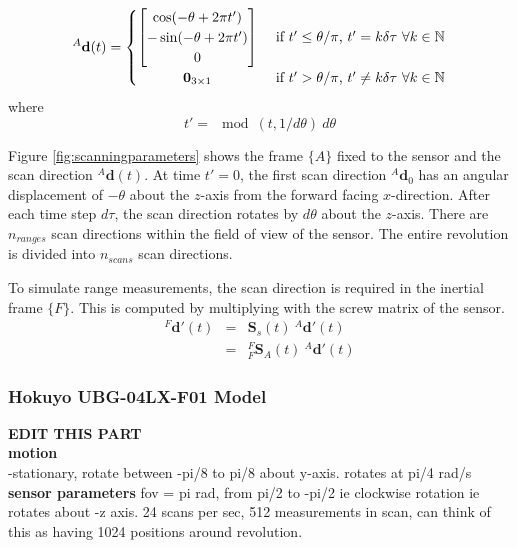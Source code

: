 \begin{equation}
^{A}\mathbf{d}(t) =
	\begin{cases} 
	      \hfill \begin{bmatrix}
	      		\cos(-\theta + 2\pi t') \\
	      		-\sin(-\theta + 2\pi t') \\
	      		0
	      	\end{bmatrix}    \hfill & \text{ if $t' \leq \theta/\pi$, $t' = k\delta\tau$  $\forall k \in \mathbb{N}$} \\
	      \hfill \mathbf{0}_{3 \times 1} \hfill & \text{ if $t' > \theta/\pi$, $t' \neq k\delta\tau$  $\forall k \in \mathbb{N}$} \\
	\end{cases} 
\end{equation}
where
\begin{equation}
t' = \mod(t,1/d\theta)\:d\theta
\end{equation}

Figure \ref{fig:scanningparameters} shows the frame $\{A\}$ fixed to the sensor and the scan direction ${^{A}\mathbf{d}(t)}$. At time $t' = 0$, the first scan direction ${^{A}\mathbf{d}_0}$ has an angular displacement of $-\theta$ about the $z$-axis from the forward facing $x$-direction. After each time step $d\tau$, the scan direction rotates by $d\theta$ about the $z$-axis. There are $n_{ranges}$ scan directions within the field of view of the sensor. The entire revolution is divided into $n_{scans}$ scan directions.


To simulate range measurements, the scan direction is required in the inertial frame $\{F\}$. This is computed by multiplying with the screw matrix of the sensor.
\begin{equation}
	\begin{array}{lcl}
	{^{F}\mathbf{d'}(t)} & = & \mathbf{S}_s(t)\:{^{A}\mathbf{d'}(t)} \\
	& = & {^{F}_{F}\mathbf{S}^{}_{A}(t)}\:{^{A}\mathbf{d'}(t)}
	\end{array}
\end{equation}

\subsubsection{Hokuyo UBG-04LX-F01 Model} 
\textbf{EDIT THIS PART\\}
\textbf{motion}\\
-stationary, rotate between -pi/8 to pi/8 about y-axis. rotates at pi/4 rad/s
\textbf{sensor parameters}
fov = pi rad, from pi/2 to -pi/2 ie clockwise rotation ie rotates about -z axis.
24 scans per sec, 512 measurements in scan, can think of this as having 1024 positions around revolution.

